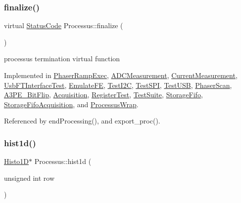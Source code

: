 \subsubsection{\texorpdfstring{finalize()}{finalize()}}
{\footnotesize\ttfamily virtual \hyperlink{classStatusCode}{Status\+Code} Processus\+::finalize (\begin{DoxyParamCaption}{ }\end{DoxyParamCaption})\hspace{0.3cm}{\ttfamily [pure virtual]}}

processus termination virtual function 

Implemented in \hyperlink{classPhaserRampExec_a8849cacdd34e7ca56f6d5e7668fe8c6c}{Phaser\+Ramp\+Exec}, \hyperlink{classADCMeasurement_a02a5ae7c0f9c90d0dad00c1d40a1c52a}{A\+D\+C\+Measurement}, \hyperlink{classCurrentMeasurement_af87fa329a11212c10e878568bcecaeb3}{Current\+Measurement}, \hyperlink{classUsbFTInterfaceTest_a652987fb86a0605842d9a8d7726b8012}{Usb\+F\+T\+Interface\+Test}, \hyperlink{classEmulateFE_a7d29ee79a606d0f7d337b1e78ef54a03}{Emulate\+FE}, \hyperlink{classTestI2C_af7f36cd1607eb089a6de1bee57c388e7}{Test\+I2C}, \hyperlink{classTestSPI_aa07f9e513271f933a9166226505779b0}{Test\+S\+PI}, \hyperlink{classTestUSB_a24bb22d7203746e6c3b5669aa71e72f3}{Test\+U\+SB}, \hyperlink{classPhaserScan_a505bd8dc2961fd220f1624cd949a266e}{Phaser\+Scan}, \hyperlink{classA3PE__BitFlip_ab40772a001613a0e1932d1e356ccf717}{A3\+P\+E\+\_\+\+Bit\+Flip}, \hyperlink{classAcquisition_ab8ffcd86548280f0403b3ae6338f2499}{Acquisition}, \hyperlink{classRegisterTest_a6d37b30d3e663c99f7deef01310bea76}{Register\+Test}, \hyperlink{classTestSuite_a3a1658a78902d96e00c888c17862abdb}{Test\+Suite}, \hyperlink{classStorageFifo_aaa04959087ffc774dbb713f9910c6c04}{Storage\+Fifo}, \hyperlink{classStorageFifoAcquisition_acb6eee350941bc44e2a4cb768b359d4f}{Storage\+Fifo\+Acquisition}, and \hyperlink{structProcessusWrap_a6be9ef2aaa45c23bc780d264875cc542}{Processus\+Wrap}.



Referenced by end\+Processing(), and export\+\_\+proc().

\mbox{\label{classProcessus_a409227db936baff03c0462c1bcfe8069}} 
\subsubsection{\texorpdfstring{hist1d()}{hist1d()}}
{\footnotesize\ttfamily \hyperlink{classHisto1D}{Histo1D}$\ast$ Processus\+::hist1d (\begin{DoxyParamCaption}\item[{unsigned int}]{row }\end{DoxyParamCaption})\hspace{0.3cm}{\ttfamily [inline]}}


